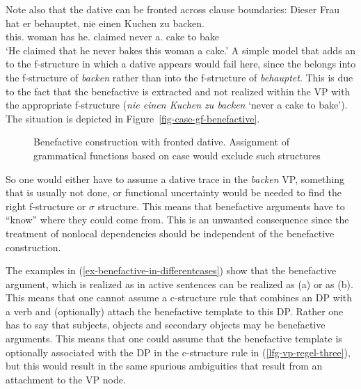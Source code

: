 Note also that the dative can be fronted across clause boundaries:
\ea
\label{ex-dieser-frau-hat-er-behauptet}
\gll Dieser Frau hat er behauptet, nie einen Kuchen zu backen.\\
     this.\dat{} woman has he.\nom{} claimed     never a.\acc{} cake to bake\\
\glt `He claimed that he never bakes this woman a cake.'
\z
A simple model that adds an \objtheta to the f-structure in which a dative appears would fail here, since
the \obj belongs into the f-structure of \emph{backen} rather than into the f-structure of
\emph{behauptet}. This is due to the fact that the benefactive is extracted and not realized within
the VP with the appropriate f-structure (\emph{nie einen Kuchen zu backen} `never a cake to
bake'). The situation is depicted in Figure~\vref{fig-case-gf-benefactive}.
\begin{figure}
{}
\caption{Benefactive construction with fronted dative. Assignment of grammatical functions based on
  case would exclude such structures}\label{fig-case-gf-benefactive}
\end{figure}
So one would either have to assume a dative trace in the \emph{backen} VP, something that is usually
not done, or functional uncertainty \citep{KZ89a} would be needed to find the right f-structure or $\sigma$ structure. This 
means that benefactive arguments have to ``know'' where they could come from. This is an unwanted
consequence since the treatment of nonlocal dependencies should be independent of the benefactive construction.

The examples in (\ref{ex-benefactive-in-differentcases}) show that the benefactive argument, which is realized as \objtheta in
active sentences can be realized as \subjlfg (a) or as \obj (b). This
means that one cannot assume a c-structure rule that combines an \objtheta DP with a verb and
(optionally) attach the benefactive template to this DP. Rather one has to say that subjects, objects and secondary
objects may be benefactive arguments. This means that one could assume that the benefactive template
is optionally associated with the DP in the c-structure rule in (\ref{lfg-vp-regel-three}), but this
would result in the same spurious ambiguities that result from an attachment to the VP node. 



